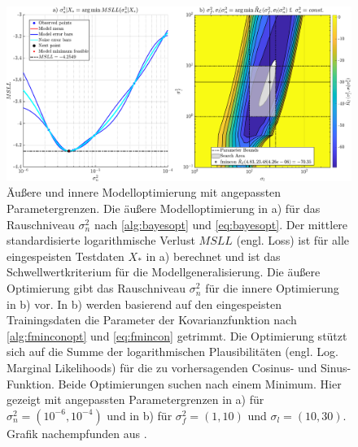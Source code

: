 \clearpage
\begin{landscape}
\begin{figure}[tbph]
	\centering
	\includegraphics[width=.9\linewidth]{chapters/images/4-EuOExp/QFCAPX-Z-N17-Bounds}
	\caption[Äußere und innere Modelloptimierung mit angepassten Parametergrenzen]{Äußere und innere Modelloptimierung mit angepassten Parametergrenzen. Die äußere Modelloptimierung in a) für das Rauschniveau $\sigma_n^2$ nach \autoref{alg:bayesopt} und \autoref{eq:bayesopt}. Der mittlere standardisierte logarithmische Verlust $MSLL$ (engl. Loss) ist für alle eingespeisten Testdaten $X_*$ in a) berechnet und ist das Schwellwertkriterium für die Modellgeneralisierung. Die äußere Optimierung gibt das Rauschniveau $\sigma_n^2$ für die innere Optimierung in b) vor. In b) werden basierend auf den eingespeisten Trainingsdaten die Parameter der Kovarianzfunktion nach \autoref{alg:fminconopt} und \autoref{eq:fmincon} getrimmt. Die Optimierung stützt sich auf die Summe der logarithmischen Plausibilitäten (engl. Log. Marginal Likelihoods) für die zu vorhersagenden Cosinus- und Sinus-Funktion. Beide Optimierungen suchen nach einem Minimum. Hier gezeigt mit angepassten Parametergrenzen in a) für $\sigma_n^2 = (10^{-6}, 10^{-4})$ und in b) für $\sigma_f^2 = (1, 10)$ und $\sigma_l = (10, 30)$. Grafik nachempfunden aus \cite{Rasmussen2006}.}
	\label{fig:qfcapx-z-n17-bounds}
\end{figure}
\end{landscape}


